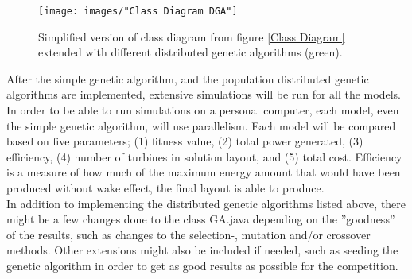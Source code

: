 \begin{figure}[h!]
\begin{center}
\texttt{[image: images/"Class Diagram DGA"]}
\caption{Simplified version of class diagram from figure \ref{Class Diagram} extended with different distributed genetic algorithms (green).}
\label{Class Diagram DGA}
\end{center}
\end{figure}

\noindent After the simple genetic algorithm, and the population distributed genetic algorithms are implemented, extensive simulations will be run for all the models. In order to be able to run simulations on a personal computer, each model, even the simple genetic algorithm, will use parallelism. Each model will be compared based on five parameters; (1) fitness value, (2) total power generated, (3) efficiency, (4) number of turbines in solution layout, and (5) total cost. Efficiency is a measure of how much of the maximum energy amount that would have been produced without wake effect, the final layout is able to produce. \\

\noindent In addition to implementing the distributed genetic algorithms listed above, there might be a few changes done to the class GA.java depending on the ''goodness'' of the results, such as changes to the selection-, mutation and/or crossover methods. Other extensions might also be included if needed, such as seeding the genetic algorithm in order to get as good results as possible for the competition.\\

